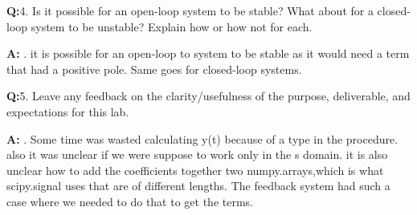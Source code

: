 \documentclass[12pt,a4paper]{article}
\newcommand{\Q}{\leavevmode\par\textbf {Q:}}
\newcommand{\A}{\par\textbf{A:} \normalfont}
\begin{document}
\Q 4. Is it possible for an open-loop system to be stable? What about for a closed-loop system to be unstable? Explain how or how not for each.
\A 4. it is possible for an open-loop to system to be stable as it would need a term that had a positive pole. Same goes for closed-loop systems.

\Q 5. Leave any feedback on the clarity/usefulness of the purpose, deliverable, and expectations for this lab.
\A 5. Some time was wasted calculating y(t) because of a type in the procedure.
also it was unclear if we were suppose to work only in the s domain.
 it is also unclear how to add the coefficients together two numpy.arrays,which is what scipy.signal uses that are of different lengths. The feedback system had such a case where we needed to do that to get the terms.





\end{document}
